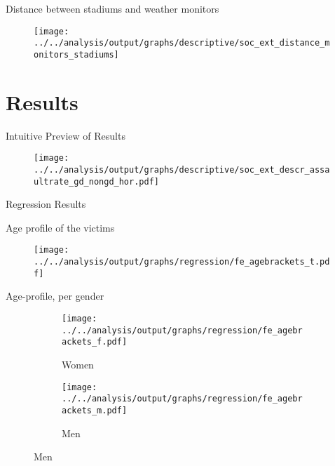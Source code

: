 \documentclass[usenames,dvipsnames]{beamer} %
\begin{document}
	\begin{frame}{Distance between stadiums and weather monitors}
		\begin{figure}
			\texttt{[image: ../../analysis/output/graphs/descriptive/soc\_ext\_distance\_monitors\_stadiums]}
		\end{figure}
	\end{frame}


	
\section{Results}

	\begin{frame}{Intuitive Preview of Results}
		\begin{figure}
			\texttt{[image: ../../analysis/output/graphs/descriptive/soc\_ext\_descr\_assaultrate\_gd\_nongd\_hor.pdf]}
		\end{figure}
	\end{frame}

	\begin{frame}{Regression Results}
		
	\end{frame}


	\begin{frame}{Age profile of the victims}
		\begin{figure}[H]\centering
			\texttt{[image: ../../analysis/output/graphs/regression/fe\_agebrackets\_t.pdf]}
		\end{figure}
	\end{frame}


	\begin{frame}{Age-profile, per gender}
		\begin{figure}
				\begin{subfigure}[h]{0.48\linewidth}\centering\caption{Women}
				\texttt{[image: ../../analysis/output/graphs/regression/fe\_agebrackets\_f.pdf]}
			\end{subfigure}
			\begin{subfigure}[h]{0.48\linewidth}\centering\caption{Men}
				\texttt{[image: ../../analysis/output/graphs/regression/fe\_agebrackets\_m.pdf]}
			\end{subfigure}
		\end{figure}
	\end{frame}
\end{document}
